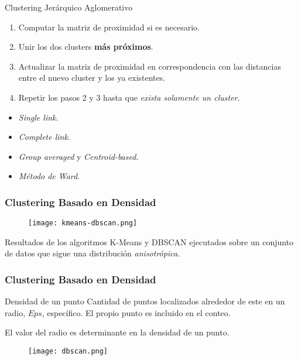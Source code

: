 \begin{frame}

    \begin{block}{Clustering Jerárquico Aglomerativo}
        \begin{enumerate}
            \item<2-> Computar la matriz de proximidad si es necesario.
            \item<3-> Unir los dos clusters \textbf{más próximos}.
            \item<4-> Actualizar la matriz de proximidad en correspondencia con las distancias entre el nuevo cluster y los ya existentes.
            \item<5-> Repetir los pasos 2 y 3 hasta que \textit{exista solamente un cluster}.
        \end{enumerate}
    \end{block}

    \begin{itemize}
        \item<6-> \textit{Single link}.
        \item<7-> \textit{Complete link}.
        \item<8-> \textit{Group averaged} y \textit{Centroid-based}.
        \item<9-> \textit{Método de Ward}.
    \end{itemize}

\end{frame}

\begin{frame}
    \frametitle{Clustering Basado en Densidad}

    \begin{figure}[!h]
        \centering
        \texttt{[image: kmeans-dbscan.png]}
    \end{figure}

    {\footnotesize
    Resultados de los algoritmos K-Means y DBSCAN ejecutados sobre un conjunto de datos que sigue una distribución \textit{anisotrópica}.
    }

\end{frame}

\begin{frame}
    \frametitle{Clustering Basado en Densidad}

    \begin{block}{Densidad de un punto}
        Cantidad de puntos localizados alrededor de este en un radio, $Eps$, específico.
        El propio punto es incluido en el conteo.
    \end{block}

    \pause
    \alert{El valor del radio es determinante en la densidad de un punto.}

    \pause
    \begin{figure}[!h]
        \centering
        \texttt{[image: dbscan.png]}
    \end{figure}
\end{frame}

